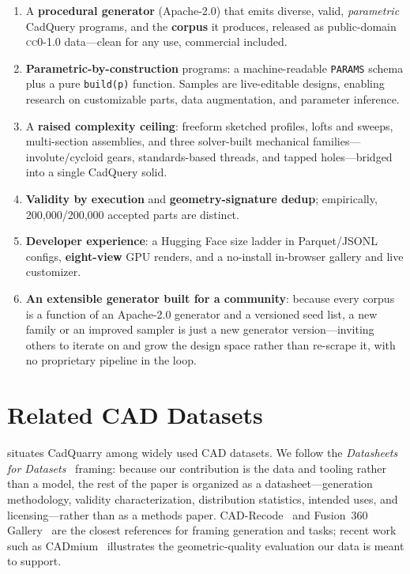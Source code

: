 \documentclass[11pt]{article}
\newcommand{\code}[1]{\texttt{#1}}
\newcommand{\cc}{\textsc{cc0-1.0}}
\newcommand{\apache}{Apache-2.0}
\begin{document}
\begin{keybox}[Contributions]
\begin{enumerate}[label=\textbf{\arabic*.}]
  \item A \textbf{procedural generator} (\apache{}) that emits diverse, valid,
        \emph{parametric} CadQuery programs, and the \textbf{corpus} it produces,
        released as public-domain \cc{} data---clean for any use, commercial
        included.
  \item \textbf{Parametric-by-construction} programs: a machine-readable
        \code{PARAMS} schema plus a pure \code{build(p)} function. Samples are
        live-editable designs, enabling research on customizable parts, data
        augmentation, and parameter inference.
  \item A \textbf{raised complexity ceiling}: freeform sketched profiles, lofts
        and sweeps, multi-section assemblies, and three solver-built mechanical
        families---involute/cycloid gears, standards-based threads, and tapped
        holes---bridged into a single CadQuery solid.
  \item \textbf{Validity by execution} and \textbf{geometry-signature dedup};
        empirically, 200{,}000/200{,}000 accepted parts are distinct.
  \item \textbf{Developer experience}: a Hugging Face size ladder in Parquet/JSONL
        configs, \textbf{eight-view} GPU renders, and a no-install in-browser
        gallery and live customizer.
  \item \textbf{An extensible generator built for a community}: because every
        corpus is a function of an \apache{} generator and a versioned seed list,
        a new family or an improved sampler is just a new generator
        version---inviting others to iterate on and grow the design space rather
        than re-scrape it, with no proprietary pipeline in the loop.
\end{enumerate}
\end{keybox}

\section{Related CAD Datasets}\label{sec:related}
 situates CadQuarry among widely used CAD datasets. We follow
the \emph{Datasheets for Datasets}~\cite{datasheets} framing: because our
contribution is the data and tooling rather than a model, the rest of the paper
is organized as a datasheet---generation methodology, validity characterization,
distribution statistics, intended uses, and licensing---rather than as a methods
paper. CAD-Recode~\cite{cadrecode} and Fusion~360 Gallery~\cite{fusion360} are
the closest references for framing generation and tasks; recent work such as
CADmium~\cite{cadmium} illustrates the geometric-quality evaluation our data is
meant to support.
\end{document}
